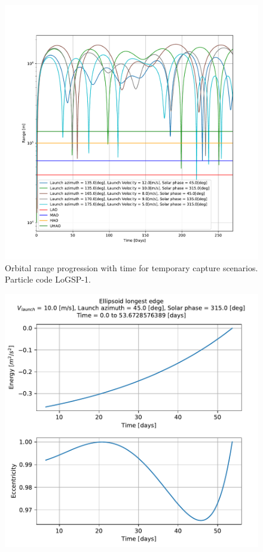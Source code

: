 \documentclass[print]{tudelft-report}
\begin{document}
\begin{appendices}
\begin{figure}[p]
    \includegraphics[scale=0.5]{Results/Images/longest_edge_perturbations/3.2Density_1cmSize/altitude_versus_time_all_cases_part_2.pdf}
    \caption{Orbital range progression with time for temporary capture scenarios. Particle code LoGSP-1.}
    \label{fig:LoGSP_1_capture_orbital_range}
    \end{figure}
    \FloatBarrier
    \begin{figure}[htb]
    \centering
    \captionsetup{justification=centering}
    \includegraphics[width=\linewidth, height=0.5\textheight, keepaspectratio=true]{Results/Images/longest_edge_perturbations/3.2Density_1cmSize/10ms_45Azimuth_315SolarPhase/noSRP_eccentricity_energy.pdf}

\end{figure}
\end{appendices}
\end{document}
